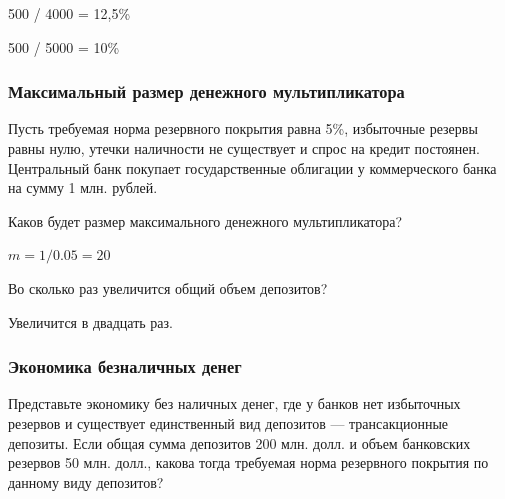 \documentclass[12pt, table, a4paper,twoside]{exam}
\begin{document}
\begin{questions}
\begin{subparts}
	\begin{solution}[12em]

	500 / 4000 = 12,5\%
	
	500 / 5000 = 10\% 
		
	\end{solution}
	
\end{subparts}
\addpoints

\subsubsection{Максимальный размер денежного мультипликатора}
\question[10] Пусть требуемая норма резервного покрытия равна 5\%, избыточные резервы равны нулю, утечки наличности не существует и спрос на кредит постоянен. Центральный банк покупает государственные облигации у коммерческого банка на сумму 1 млн. рублей.
\noaddpoints

\begin{subparts}
	\subpart[5] Каков будет размер максимального денежного мультипликатора?
	
	\begin{solution}[12em]
		
		$m = 1/0.05 = 20$
		
	\end{solution}
	
	\subpart[5] Во сколько раз увеличится общий объем депозитов?
	
	\begin{solution}[12em]
		
		Увеличится в двадцать раз.
		
	\end{solution}
	
\end{subparts}
\addpoints

\subsubsection{Экономика безналичных денег}


\question[10] Представьте экономику без наличных денег, где у банков нет избыточных резервов и существует единственный вид депозитов — трансакционные депозиты. Если общая сумма депозитов 200 млн. долл. и объем банковских резервов 50 млн. долл., какова тогда требуемая норма резервного покрытия по данному виду депозитов?

\begin{solution}[12em]
	

\end{solution}
\end{questions}
\end{document}
